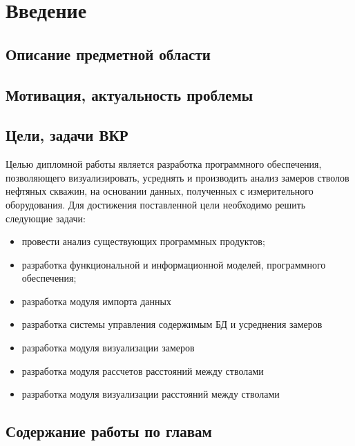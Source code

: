 \newpage
\section*{Введение}
\subsection*{Описание предметной области}

\subsection*{Мотивация, актуальность проблемы}

\subsection*{Цели, задачи ВКР}
Целью дипломной работы является разработка программного обеспечения, позволяющего визуализировать, усреднять и производить анализ замеров стволов нефтяных скважин,
на основании данных, полученных с измерительного оборудования. Для достижения поставленной цели необходимо решить следующие задачи:
\begin{itemize}
  \item провести анализ существующих программных продуктов;
  \item разработка функциональной и информационной моделей, программного обеспечения;
  \item разработка модуля импорта данных
  \item разработка системы управления содержимым БД и усреднения замеров
  \item разработка модуля визуализации замеров
  \item разработка модуля рассчетов расстояний между стволами
  \item разработка модуля визуализации расстояний между стволами
\end{itemize}

\subsection*{Содержание работы по главам}

